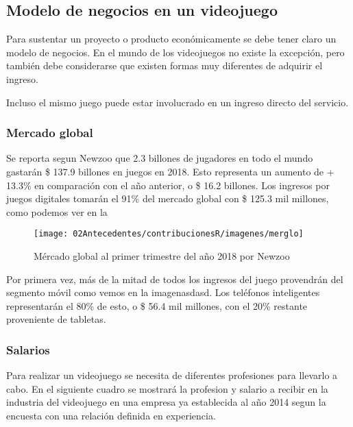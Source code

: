 \subsection{Modelo de negocios en un videojuego}\label{modeloNegocio}
Para sustentar un proyecto o producto económicamente se debe tener claro un modelo de negocios. En el mundo de los videojuegos no existe la excepción, pero también debe considerarse que existen formas muy diferentes de adquirir el ingreso.

Incluso el mismo juego puede estar involucrado en un ingreso directo del servicio.

\subsubsection{Mercado global}
Se reporta segun Newzoo \cite{newzoo2018} que 2.3 billones de jugadores en todo el mundo gastarán \$ 137.9 billones en juegos en 2018. Esto representa un aumento de + 13.3\% en comparación con el año anterior, o \$ 16.2 billones. Los ingresos por juegos digitales tomarán el 91\% del mercado global con \$ 125.3 mil millones, como podemos ver en la \cite{fig:merglo}
\begin{figure}
	\centering
	\caption{Mércado global al primer trimestre del año 2018 por Newzoo \cite{newzoo2018}}
	\label{fig:merglo}
	\texttt{[image: 02Antecedentes/contribucionesR/imagenes/merglo]}
\end{figure}

Por primera vez, más de la mitad de todos los ingresos del juego provendrán del segmento móvil como vemos en la imagen{asdasd}. Los teléfonos inteligentes representarán el 80\% de esto, o \$ 56.4 mil millones, con el 20\% restante proveniente de tabletas.

\subsubsection{Salarios}
Para realizar un videojuego se necesita de diferentes profesiones para llevarlo a cabo.
En el siguiente cuadro se mostrará la profesion y salario a recibir en la industria del videojuego en una empresa ya establecida al año 2014 segun la encuesta con una relación definida en experiencia.

